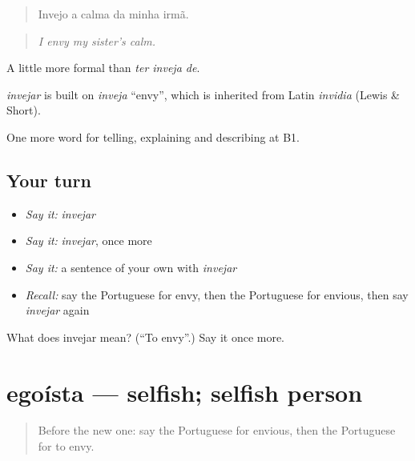 \begin{quote}
Invejo a calma da minha irmã.
\end{quote}

\begin{quote}
\emph{I envy my sister's calm.}
\end{quote}

A little more formal than \emph{ter inveja de}.

\begin{cousinweb}
\emph{invejar} is built on \emph{inveja} \textquotedblleft{}envy\textquotedblright{}, which is inherited from Latin \emph{invidia} (Lewis \& Short).
\end{cousinweb}

\begin{grammarlens}[title={What you've built}]
One more word for telling, explaining and describing at B1.
\end{grammarlens}

\subsection*{Your turn}
\begin{itemize}
\raggedright
  \item \emph{Say it:} \emph{invejar}
  \item \emph{Say it:} \emph{invejar}, once more
  \item \emph{Say it:} a sentence of your own with \emph{invejar}
  \item \emph{Recall:} say the Portuguese for envy, then the Portuguese for envious, then say \emph{invejar} again
\end{itemize}

\begin{tcolorbox}[breakable,colback=teal!4,colframe=teal!35!black,title={Before you move on}]
What does invejar mean? (\textquotedblleft{}To envy\textquotedblright{}.) Say it once more.
\end{tcolorbox}
\section[egoísta]{egoísta — selfish; selfish person}

\label{lesson:PT-C468-egoista}



\begin{quote}
Before the new one: say the Portuguese for envious, then the Portuguese for to envy.
\end{quote}

